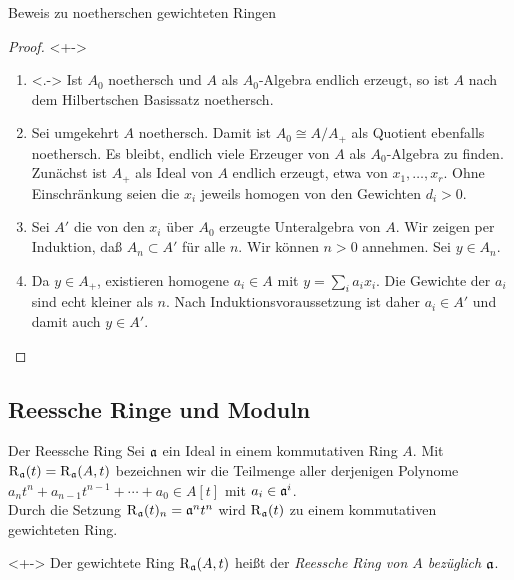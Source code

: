 \begin{frame}{Beweis zu noetherschen gewichteten Ringen}
	\begin{proof}<+->
		\begin{enumerate}[<+->]
		\item<.->
			Ist \(A_0\) noethersch und \(A\) als \(A_0\)-Algebra endlich erzeugt,
			so ist \(A\) nach dem Hilbertschen Basissatz noethersch.
		\item
			Sei umgekehrt \(A\) noethersch. Damit ist \(A_0 \cong A/A_+\) als
			Quotient ebenfalls noethersch. Es bleibt, endlich viele Erzeuger
			von \(A\) als \(A_0\)-Algebra zu finden. Zunächst ist
			\(A_+\) als Ideal von \(A\) endlich erzeugt, etwa von \(x_1, \dotsc,
			x_r\). Ohne Einschränkung seien die \(x_i\) jeweils homogen von
			den Gewichten \(d_i > 0\).
		\item
			Sei \(A'\) die von den \(x_i\) über \(A_0\) erzeugte Unteralgebra
			von \(A\). Wir zeigen per Induktion, daß \(A_n \subset A'\) für
			alle \(n\). Wir können \(n > 0\) annehmen. Sei \(y \in A_n\).
		\item
			Da \(y \in A_+\), existieren homogene \(a_i \in A\) 
			mit \(y = \sum\limits_i a_i x_i\). Die Gewichte der \(a_i\) sind echt
			kleiner als \(n\). Nach Induktionsvoraussetzung ist daher \(a_i \in A'\)
			und damit auch \(y \in A'\).
			\qedhere
		\end{enumerate}
	\end{proof}
\end{frame}

\subsection{Reessche Ringe und Moduln}

\begin{frame}{Der Reessche Ring}
	Sei \(\mathfrak{a}\) ein Ideal in einem kommutativen Ring \(A\). Mit
	\(\operatorname{R}_{\mathfrak{a}}(t) = \operatorname{R}_{\mathfrak{a}}(A, t)\) bezeichnen wir die Teilmenge aller derjenigen Polynome
	\(a_n t^n + a_{n - 1} t^{n - 1} + \dotsb + a_0 \in A[t]\) mit
	\(a_i \in \mathfrak{a}^i\).
	\\
	Durch die Setzung \(\operatorname{R}_{\mathfrak{a}}(t)_n = \mathfrak{a}^n t^n\) wird
	\(\operatorname{R}_{\mathfrak{a}}(t)\) zu einem kommutativen gewichteten Ring.
	\begin{definition}<+->
		Der gewichtete Ring \(\operatorname{R}_{\mathfrak{a}}(A, t)\) heißt der \emph{Reessche
		Ring von \(A\) bezüglich \(\mathfrak{a}\)}.
	\end{definition}
\end{frame}


